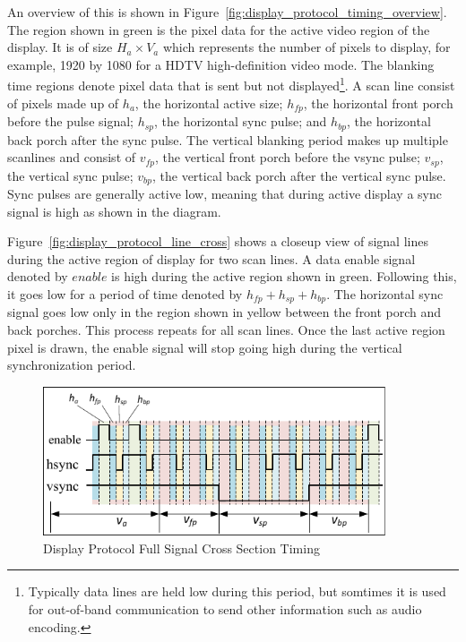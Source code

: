 
    An overview of this is shown in Figure~\ref{fig:display_protocol_timing_overview}. The region shown in green is the pixel data for the active video region of the display. It is of size $H_a\times V_a$ which represents the number of pixels to display, for example, 1920 by 1080 for a HDTV high-definition video mode\cite{MythTVWebsite}. The blanking time regions denote pixel data that is sent but not displayed\footnote{Typically data lines are held low during this period, but somtimes it is used for out-of-band communication to send other information such as audio encoding.}. A scan line consist of pixels made up of $h_a$, the horizontal active size; $h_{fp}$, the horizontal front porch before the pulse signal; $h_{sp}$, the horizontal sync pulse; and $h_{bp}$, the horizontal back porch after the sync pulse. The vertical blanking period makes up multiple scanlines and consist of $v_{fp}$, the vertical front porch before the vsync pulse; $v_{sp}$, the vertical sync pulse; $v_{bp}$, the vertical back porch after the vertical sync pulse. Sync pulses are generally active low, meaning that during active display a sync signal is high as shown in the diagram.

    Figure~\ref{fig:display_protocol_line_cross} shows a closeup view of signal lines during the active region of display for two scan lines. A data enable signal denoted by $enable$ is high during the active region shown in green. Following this, it goes low for a period of time denoted by $h_{fp}+h_{sp}+h_{bp}$. The horizontal sync signal goes low only in the region shown in yellow between the front porch and back porches. This process repeats for all scan lines. Once the last active region pixel is drawn, the enable signal will stop going high during the vertical synchronization period.


    \begin{figure}
        \centering
        \includegraphics[width=0.9\textwidth]{fig/display_timing_full_cross.pdf}
        \caption{Display Protocol Full Signal Cross Section Timing}
        \label{fig:display_protocol_full_cross}
    \end{figure}

